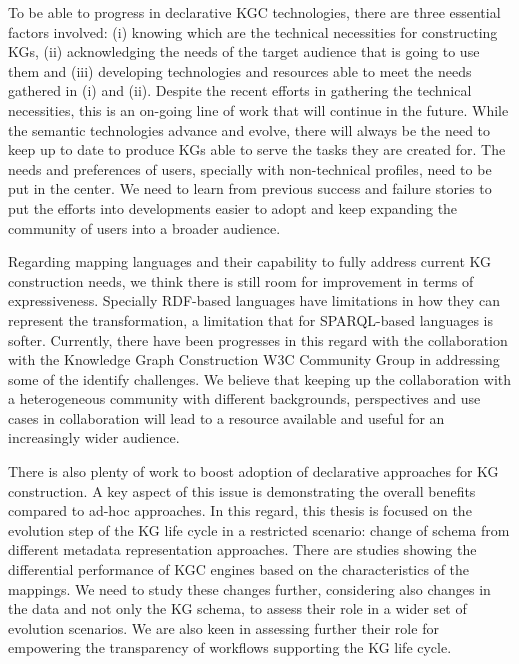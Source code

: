 



To be able to progress in declarative KGC technologies, there are three essential factors involved: (i) knowing which are the technical necessities for constructing KGs, (ii) acknowledging the needs of the target audience that is going to use them and (iii) developing technologies and resources able to meet the needs gathered in (i) and (ii). 
Despite the recent efforts in gathering the technical necessities, this is an on-going line of work that will continue in the future. While the semantic technologies advance and evolve, there will always be the need to keep up to date to produce KGs able to serve the tasks they are created for. The needs and preferences of users, specially with non-technical profiles, need to be put in the center. We need to learn from previous success and failure stories to put the efforts into developments easier to adopt and keep expanding the community of users into a broader audience. %

Regarding mapping languages and their capability to fully address current KG construction needs, we think there is still room for improvement in terms of expressiveness. Specially RDF-based languages have limitations in how they can represent the transformation, a limitation that for SPARQL-based languages is softer. Currently, there have been progresses in this regard with the collaboration with the Knowledge Graph Construction W3C Community Group in addressing some of the identify challenges. We believe that keeping up the collaboration with a heterogeneous community with different backgrounds, perspectives and use cases in collaboration will lead to a resource available and useful for an increasingly wider audience.

There is also plenty of work to boost adoption of declarative approaches for KG construction. A key aspect of this issue is demonstrating the overall benefits compared to ad-hoc approaches. In this regard, this thesis is focused on the evolution step of the KG life cycle in a restricted scenario: change of schema from different metadata representation approaches. There are studies showing the differential performance of KGC engines based on the characteristics of the mappings. We need to study these changes further, considering also changes in the data and not only the KG schema, to assess their role in a wider set of evolution scenarios. We are also keen in assessing further their role for empowering the transparency of workflows supporting the KG life cycle.

